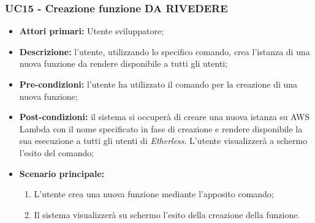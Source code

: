 \subsubsection{UC15 - Creazione funzione DA RIVEDERE}
\begin{itemize}
	\item \textbf{Attori primari:} Utente sviluppatore;
	\item \textbf{Descrizione:} l'utente, utilizzando lo specifico comando, crea l'istanza di una nuova funzione da rendere disponibile a tutti gli utenti; 
	\item \textbf{Pre-condizioni:} l'utente ha utilizzato il comando per la creazione di una nuova funzione;
	\item \textbf{Post-condizioni:} il sistema si occuperà di creare una nuova istanza su AWS Lambda con il nome specificato in fase di creazione e rendere disponibile la sua esecuzione a tutti gli utenti di \textit{Etherless}. L'utente visualizzerà a schermo l'esito del comando;
	\item \textbf{Scenario principale:} 
	\begin{enumerate}
		\item L'utente crea una nuova funzione mediante l'apposito comando;
		\item Il sistema visualizzerà su schermo l'esito della creazione della funzione.
	\end{enumerate}
\end{itemize}